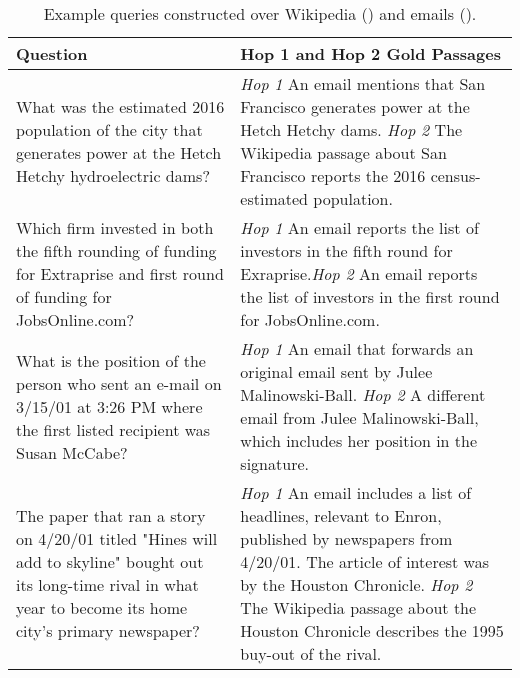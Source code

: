 \documentclass{article}
\begin{document}
\begin{table*}[t]
\small
\begin{tabular}{p{5.3cm}p{9.8cm}}
\toprule
Question & Hop 1 and Hop 2 Gold Passages  \\
\midrule
What was the estimated 2016 population of the city that generates power at the Hetch Hetchy hydroelectric dams? &
\textit{Hop 1} An email mentions that San Francisco generates power at the Hetch Hetchy dams. \newline \textit{Hop 2} The Wikipedia passage about San Francisco reports the 2016 census-estimated population.
\\
\midrule
Which firm invested in both the fifth rounding of funding for Extraprise and first round of funding for JobsOnline.com? & 
\textit{Hop 1} An email reports the list of investors in the fifth round for Exraprise.\newline \textit{Hop 2} An email reports the list of investors in the first round for JobsOnline.com. 
\\
\midrule
What is the position of the person who sent an e-mail on 3/15/01 at 3:26 PM where the first listed recipient was Susan McCabe? &
\textit{Hop 1} An email that forwards an original email sent by Julee Malinowski-Ball.\newline
\textit{Hop 2} A different email from Julee Malinowski-Ball, which includes her position in the signature. \\
\midrule
The paper that ran a story on 4/20/01 titled "Hines will add to skyline" bought out its long-time rival in what year to become its home city's primary newspaper? &
\textit{Hop 1} An email includes a list of headlines, relevant to Enron, published by newspapers from 4/20/01. The article of interest was by the Houston Chronicle. \newline
\textit{Hop 2} The Wikipedia passage about the Houston Chronicle describes the 1995 buy-out of the rival. \\
\bottomrule
\end{tabular}
\caption{Example queries constructed over Wikipedia () and emails (). }
\label{tab:enron_demo_examples}
\end{table*}
\end{document}
